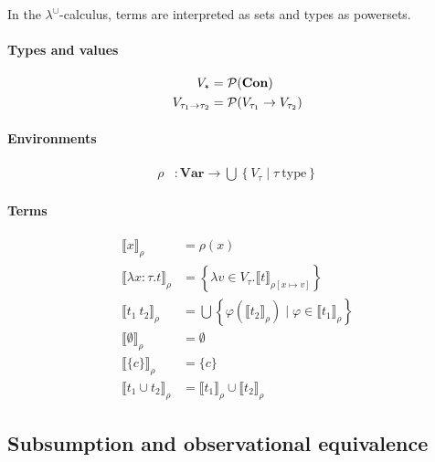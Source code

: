 \documentclass{llncs}
\newcommand{\LambdaUnion}{\lambda^\cup}
\newcommand{\LuAbs}[3]{\lambda #1 : #2. #3}
\newcommand{\LuApp}[2]{#1\ #2}
\newcommand{\LuBase}{\text{\rotatebox[origin=c]{180}{$\star$}}}
\newcommand{\LuCON}{c}
\newcommand{\LuCon}[1][\LuCON]{\{#1\}}
\newcommand{\LuEmpty}{\emptyset}
\newcommand{\LuTm}{t}
\newcommand{\LuTy}{\tau}
\newcommand{\LuUnion}[2]{#1 \cup #2}
\newcommand{\LuVar}{x}
\newcommand{\ClassVar}{\mathbf{Var}}
\newcommand{\ClassCon}{\mathbf{Con}}
\begin{document}

In the $\LambdaUnion$-calculus, terms are interpreted as sets and types as powersets.
    \paragraph{Types and values}
    \begin{align*}
        V_\LuBase &= \mathcal{P}(\ClassCon) \\
        V_{\tau_1 \to \tau_2} &= \mathcal{P}(V_{\tau_1} \to V_{\tau_2})
    \end{align*}
    \paragraph{Environments}
    \begin{align*}
        \rho &: \ClassVar \to \bigcup \left\{V_\tau \mid \tau\ \mathrm{type}\right\}
    \end{align*}
    \paragraph{Terms}
    \begin{align*}
        \llbracket \LuVar \rrbracket_\rho &= \rho(x) \\
        \llbracket \LuAbs{\LuVar}{\LuTy}{\LuTm} \rrbracket_\rho &= \left\{ \lambda v \in V_\tau. \llbracket t \rrbracket_{\rho[\LuVar \mapsto v]} \right\} \\
        \llbracket \LuApp{\LuTm_1}{\LuTm_2} \rrbracket_\rho &= \bigcup \left\{ \varphi(\llbracket \LuTm_2 \rrbracket_\rho) \mid \varphi \in \llbracket \LuTm_1 \rrbracket_\rho \right\}\\
        \llbracket \LuEmpty \rrbracket_\rho &= \LuEmpty \\
        \llbracket \LuCon \rrbracket_\rho &= \LuCon \\
        \llbracket \LuUnion{\LuTm_1}{\LuTm_2} \rrbracket_\rho &= \llbracket \LuTm_1 \rrbracket_\rho \cup \llbracket \LuTm_2 \rrbracket_\rho
    \end{align*}

\subsection{Subsumption and observational equivalence}
\end{document}
